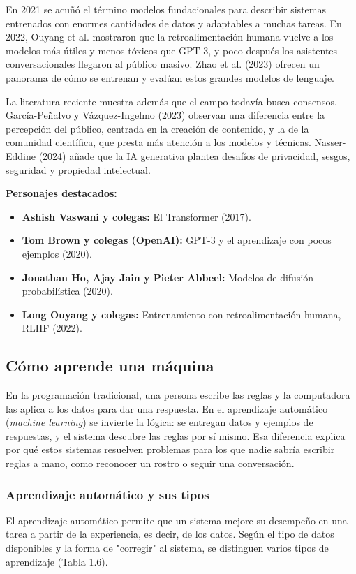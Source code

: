 En 2021 se acuñó el término modelos fundacionales para describir sistemas entrenados con enormes cantidades de datos y adaptables a muchas tareas. En 2022, Ouyang et al. mostraron que la retroalimentación humana vuelve a los modelos más útiles y menos tóxicos que GPT-3, y poco después los asistentes conversacionales llegaron al público masivo. Zhao et al. (2023) ofrecen un panorama de cómo se entrenan y evalúan estos grandes modelos de lenguaje.

La literatura reciente muestra además que el campo todavía busca consensos. García-Peñalvo y Vázquez-Ingelmo (2023) observan una diferencia entre la percepción del público, centrada en la creación de contenido, y la de la comunidad científica, que presta más atención a los modelos y técnicas. Nasser-Eddine (2024) añade que la IA generativa plantea desafíos de privacidad, sesgos, seguridad y propiedad intelectual.

\textbf{Personajes destacados:}
\begin{itemize}
    \item \textbf{Ashish Vaswani y colegas:} El Transformer (2017).
    \item \textbf{Tom Brown y colegas (OpenAI):} GPT-3 y el aprendizaje con pocos ejemplos (2020).
    \item \textbf{Jonathan Ho, Ajay Jain y Pieter Abbeel:} Modelos de difusión probabilística (2020).
    \item \textbf{Long Ouyang y colegas:} Entrenamiento con retroalimentación humana, RLHF (2022).
\end{itemize}

\vspace{0.3cm}

\subsection{Cómo aprende una máquina}

En la programación tradicional, una persona escribe las reglas y la computadora las aplica a los datos para dar una respuesta. En el aprendizaje automático (\textit{machine learning}) se invierte la lógica: se entregan datos y ejemplos de respuestas, y el sistema descubre las reglas por sí mismo. Esa diferencia explica por qué estos sistemas resuelven problemas para los que nadie sabría escribir reglas a mano, como reconocer un rostro o seguir una conversación.

\subsubsection{Aprendizaje automático y sus tipos}
El aprendizaje automático permite que un sistema mejore su desempeño en una tarea a partir de la experiencia, es decir, de los datos. Según el tipo de datos disponibles y la forma de "corregir" al sistema, se distinguen varios tipos de aprendizaje (Tabla 1.6).

